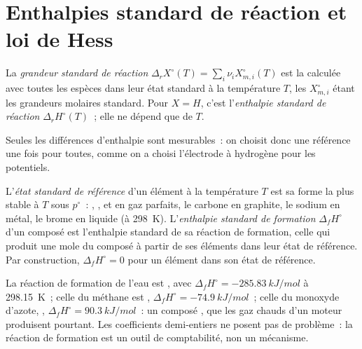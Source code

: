 \section{Enthalpies standard de réaction et loi de Hess}

\begin{definition}\label{def:b2:reaction-enthalpy:standard-reaction-enthalpy}
La \emph{grandeur standard de réaction}
$\Delta_r X^\circ(T) = \sum_i\nu_iX_{m,i}^\circ(T)$ est la 
calculée avec toutes les espèces dans leur état standard à la température $T$, les
$X_{m,i}^\circ$ étant les grandeurs molaires standard. Pour $X = H$, c'est
l'\emph{enthalpie standard de réaction}
$\Delta_r H^\circ(T)$~; elle ne dépend que de $T$.
\end{definition}

Seules les différences d'enthalpie sont mesurables~: on choisit donc une
référence une fois pour toutes, comme on a choisi l'électrode à hydrogène pour les potentiels.

\begin{definition}\label{def:b2:reaction-enthalpy:formation}
L'\emph{état standard de référence} d'un
élément à la température $T$ est sa forme la plus stable à $T$ sous $p^\circ$~:
, ,  et  en gaz parfaits, le carbone en
graphite, le sodium en métal, le brome en liquide (à \qty{298}{K}).
L'\emph{enthalpie standard de formation}
$\Delta_f H^\circ$ d'un composé est l'enthalpie standard de
sa réaction de formation, celle qui produit une mole du
composé à partir de ses éléments dans leur état de référence. Par construction,
$\Delta_f H^\circ = 0$ pour un élément dans son état de référence.
\end{definition}

\begin{example}\label{ex:b2:reaction-enthalpy:formation}
La réaction de formation de l'eau est , avec
$\Delta_f H^\circ = \qty{-285.83}{kJ/mol}$ à \qty{298.15}{K}~; celle du
méthane est , $\Delta_f H^\circ =
\qty{-74.9}{kJ/mol}$~; celle du monoxyde d'azote, , $\Delta_f H^\circ = \qty{+90.3}{kJ/mol}$~: un composé ,
que les gaz chauds d'un moteur produisent pourtant. Les coefficients
demi-entiers ne posent pas de problème~: la réaction de formation est un
outil de comptabilité, non un mécanisme.
\end{example}

